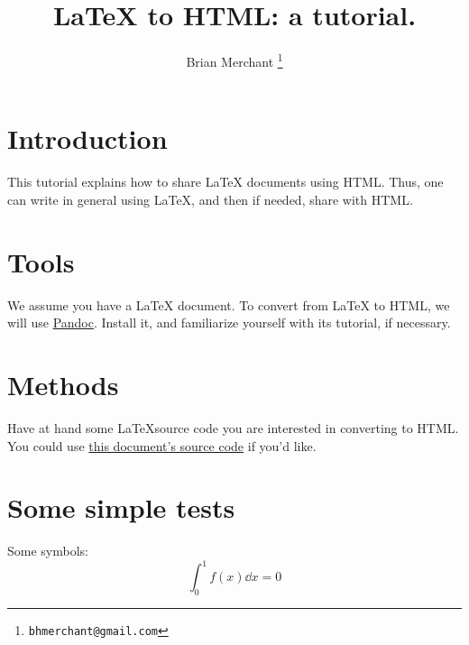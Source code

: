 \documentclass[12pt,letterpaper]{article}
\begin{document}
\title{{\LaTeX} to HTML: a tutorial.}

\author[1]{Brian Merchant \thanks{\texttt{bhmerchant@gmail.com}}}

\section{Introduction}

This tutorial explains how to share {\LaTeX} documents using HTML. Thus, one can write in general using \LaTeX, and then if needed, share with HTML.

\section{Tools}
	We assume you have a {\LaTeX} document. To convert from {\LaTeX} to HTML, we will use \href{http://www.pandoc.org/}{Pandoc}. Install it, and familiarize yourself with its tutorial, if necessary.
	
\section{Methods}
	Have at hand some \LaTeX source code you are interested in converting to HTML. You could use \href{}{this document's source code} if you'd like.
	
	
	
\section{Some simple tests}
	Some symbols:
		$$ \int_{0}^{1} f(x) \dd{x} = 0 $$
		
\end{document}
